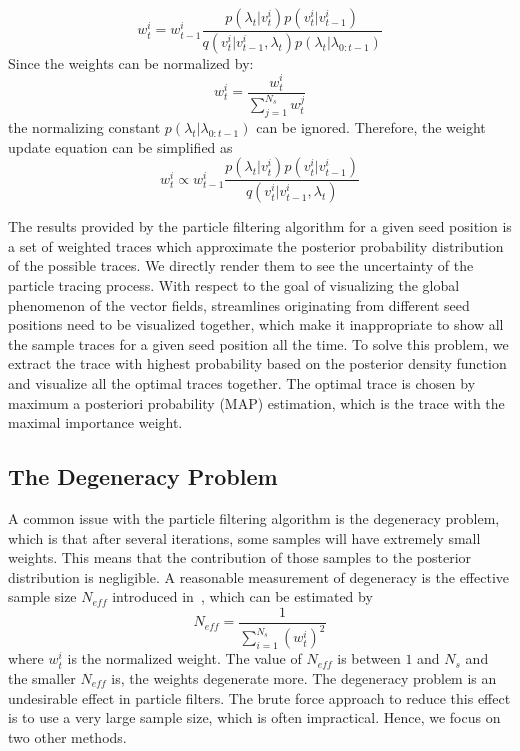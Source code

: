 \begin{equation}
  w_t^i = w_{t - 1}^i\frac{{p({\lambda_t}|v_t^i)p(v_t^i|v_{t - 1}^i)}}{{q(v_t^i|v_{t - 1}^i,{\lambda_t})p({\lambda_t}|{\lambda_{0:t - 1}})}}
\end{equation}
Since the weights can be normalized by:
\begin{equation}
  w_t^i = \frac{{w_t^i}}{{\sum\limits_{j = 1}^{{N_s}} {w_t^j} }}
\end{equation}
the normalizing constant ${p({\lambda_t}|{\lambda_{0:t - 1}})}$ can be ignored. Therefore, the weight update equation can be simplified as
\begin{equation}
  w_t^i \propto w_{t - 1}^i\frac{{p({\lambda_t}|v_t^i)p(v_t^i|v_{t - 1}^i)}}{{q(v_t^i|v_{t - 1}^i,{\lambda_t})}}
\end{equation}

The results provided by the particle filtering algorithm for a given seed position is a set of weighted traces which approximate the posterior probability distribution of the possible traces. We directly render them to see the uncertainty of the particle tracing process. With respect to the goal of visualizing the global phenomenon of the vector fields, streamlines originating from different seed positions need to be visualized together, which make it inappropriate to show all the sample traces for a given seed position all the time. To solve this problem, we extract the trace with highest probability based on the posterior density function and visualize all the optimal traces together. The optimal trace is chosen by maximum a posteriori probability (MAP) estimation, which is the trace with the maximal importance weight.

\subsection{The Degeneracy Problem}

A common issue with the particle filtering algorithm is the degeneracy problem, which is that after several iterations, some samples will have extremely small weights. This means that the contribution of those samples to the posterior distribution is negligible. A reasonable measurement of degeneracy is the effective sample size $N_{eff}$ introduced in~\cite{Liu98sequentialmonte}, which can be estimated by
\begin{equation}
  {N_{eff}} = \frac{1}{{\sum\limits_{i = 1}^{{N_s}} {{{(w_t^i)}^2}} }}
\end{equation}
where $w_t^i$ is the normalized weight. The value of $N_{eff}$ is between $1$ and $N_s$ and the smaller $N_{eff}$ is, the weights degenerate more. The degeneracy problem is an undesirable effect in particle filters. The brute force approach to reduce this effect is to use a very large sample size, which is often impractical. Hence, we focus on two other methods.

